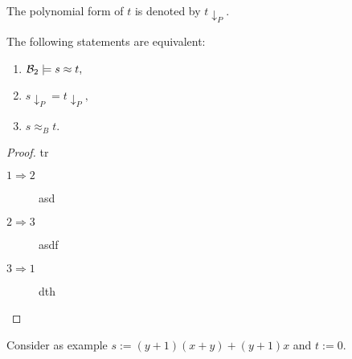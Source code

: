 	The polynomial form of $t$ is denoted by $t{\downarrow_P}$.
	\begin{theorem}
		The following statements are equivalent:
		\begin{enumerate}
			\item ${\mathcal{B}_2}\models s\approx t,$
			\item $s{\downarrow_P}=t{\downarrow_P},$
			\item $s\approx_B t.$
		\end{enumerate}
	\end{theorem}
	\begin{proof} tr
		\begin{description}
			\item[$1\Rightarrow 2$] asd
			\item[$2\Rightarrow 3$] asdf
			\item[$3\Rightarrow 1$] dth
		\end{description}
	\end{proof}
	Consider as example $s:=(y+1)(x+y)+(y+1)x$ and $t:=0$.
